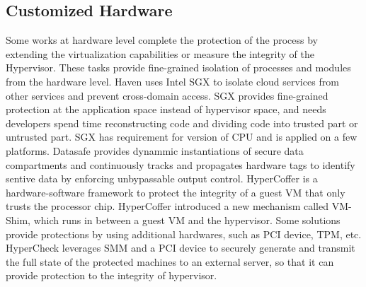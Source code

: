 \subsection{Customized Hardware }
Some works at hardware level complete the protection of the process by extending the virtualization capabilities or measure the integrity of the Hypervisor\cite{Moon2012Vigilare}\cite{Lee2013KI}\cite{azab2010hypersentry}\cite{rutkowska2008preventing}\cite{Wang2010HyperCheck}\cite{zhang2013hypercheck}\cite{azab2011sice}\cite{szefer2012architectural}. These tasks provide fine-grained isolation of processes and modules from the hardware level. Haven \cite{haven} uses Intel SGX\cite{Hoekstra13cuvillo,Mckeen2013Innovative} to isolate cloud services from other services and prevent cross-domain access. SGX provides fine-grained protection at the application space instead of hypervisor space, and needs developers spend time reconstructing code and dividing code into trusted part or untrusted part. SGX has requirement for version of CPU and is applied on a few platforms.
Datasafe\cite{chen2012software} provides dynammic instantiations of secure data compartments and continuously tracks and propagates hardware tags to identify sentive data by enforcing unbypassable output control.
HyperCoffer\cite{xia2013architecture} is a hardware-software framework to protect the integrity of a guest VM that only trusts the processor chip. HyperCoffer introduced a new mechanism called VM-Shim, which runs in between a guest VM and the hypervisor.
Some solutions provide protections by using additional hardwares, such as PCI device, TPM, etc.  HyperCheck\cite{Wang2010HyperCheck} \cite{zhang2013hypercheck} leverages SMM and a PCI device to securely generate and transmit the full state of the protected machines to an external server, so that it can provide protection to the integrity of hypervisor. 

